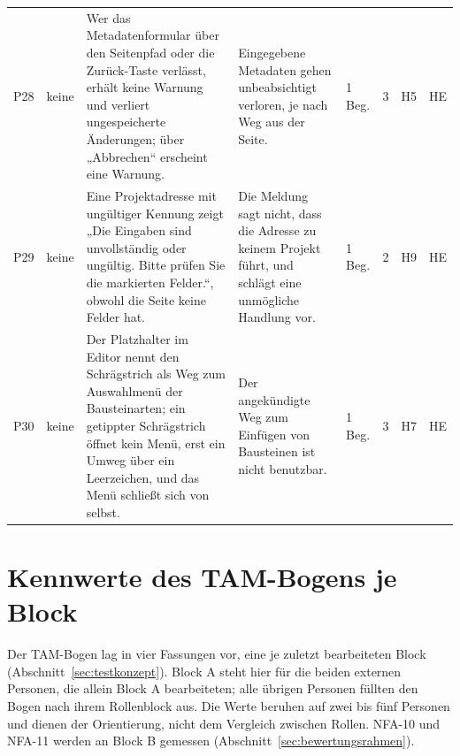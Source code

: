 \begin{longtable}{@{}L{0.6cm}L{0.8cm}L{4.9cm}L{4.0cm}L{1.2cm}L{0.7cm}L{0.7cm}L{0.8cm}@{}}
	P28 & keine & Wer das Metadatenformular über den Seitenpfad oder die Zurück-Taste verlässt, erhält keine Warnung und verliert ungespeicherte Änderungen; über „Abbrechen“ erscheint eine Warnung. & Eingegebene Metadaten gehen unbeabsichtigt verloren, je nach Weg aus der Seite. & 1 Beg. & 3 & H5 & HE \\
	P29 & keine & Eine Projektadresse mit ungültiger Kennung zeigt „Die Eingaben sind unvollständig oder ungültig. Bitte prüfen Sie die markierten Felder.“, obwohl die Seite keine Felder hat. & Die Meldung sagt nicht, dass die Adresse zu keinem Projekt führt, und schlägt eine unmögliche Handlung vor. & 1 Beg. & 2 & H9 & HE \\
	P30 & keine & Der Platzhalter im Editor nennt den Schrägstrich als Weg zum Auswahlmenü der Bausteinarten; ein getippter Schrägstrich öffnet kein Menü, erst ein Umweg über ein Leerzeichen, und das Menü schließt sich von selbst. & Der angekündigte Weg zum Einfügen von Bausteinen ist nicht benutzbar. & 1 Beg. & 3 & H7 & HE \\
\end{longtable}
\endgroup

\chapter{Kennwerte des TAM-Bogens je Block}
\label{anh:tam-bloecke}

Der TAM-Bogen lag in vier Fassungen vor, eine je zuletzt bearbeiteten Block (Abschnitt~\ref{sec:testkonzept}). Block A steht hier für die beiden externen Personen, die allein Block A bearbeiteten; alle übrigen Personen füllten den Bogen nach ihrem Rollenblock aus. Die Werte beruhen auf zwei bis fünf Personen und dienen der Orientierung, nicht dem Vergleich zwischen Rollen. NFA-10 und NFA-11 werden an Block B gemessen (Abschnitt~\ref{sec:bewertungsrahmen}).

